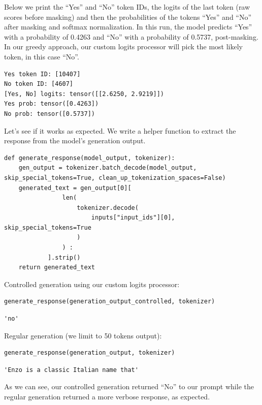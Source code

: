 Below we print the ``Yes'' and ``No'' token IDs, the logits of the last token (raw scores before masking) and then the probabilities of the tokens ``Yes'' and ``No'' after masking and softmax normalization. In this run, the model predicts ``Yes'' with a probability of 0.4263 and ``No'' with a probability of 0.5737, post-masking. In our greedy approach, our custom logits processor will pick the most likely token, in this case ``No''.

\begin{verbatim}
Yes token ID: [10407]
No token ID: [4607]
[Yes, No] logits: tensor([[2.6250, 2.9219]])
Yes prob: tensor([0.4263])
No prob: tensor([0.5737])
\end{verbatim}

Let's see if it works as expected. We write a helper function to extract the response from the model's generation output.

\begin{verbatim}
def generate_response(model_output, tokenizer):
    gen_output = tokenizer.batch_decode(model_output, skip_special_tokens=True, clean_up_tokenization_spaces=False)
    generated_text = gen_output[0][
                len(
                    tokenizer.decode(
                        inputs["input_ids"][0], skip_special_tokens=True
                    )
                ) :
            ].strip()
    return generated_text
\end{verbatim}

Controlled generation using our custom logits processor:

\begin{verbatim}
generate_response(generation_output_controlled, tokenizer)
\end{verbatim}

\begin{verbatim}
'no'
\end{verbatim}

Regular generation (we limit to 50 tokens output):

\begin{verbatim}
generate_response(generation_output, tokenizer)
\end{verbatim}

\begin{verbatim}
'Enzo is a classic Italian name that'
\end{verbatim}

As we can see, our controlled generation returned ``No'' to our prompt while the regular generation returned a more verbose response, as expected.


